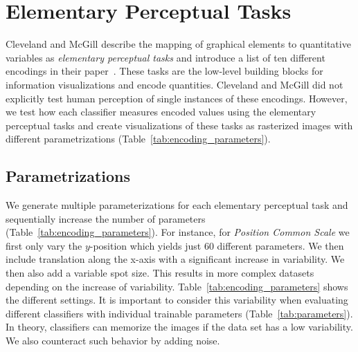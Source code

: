 \section{Elementary Perceptual Tasks}

Cleveland and McGill describe the mapping of graphical elements to quantitative variables as \emph{elementary perceptual tasks} and introduce a list of ten different encodings in their paper~\cite{cleveland_mcgill}. These tasks are the low-level building blocks for information visualizations and encode quantities. Cleveland and McGill did not explicitly test human perception of single instances of these encodings. However, we test how each classifier measures encoded values using the elementary perceptual tasks and create visualizations of these tasks as rasterized images with different parametrizations (Table~\ref{tab:encoding_parameters}).

\subsection{Parametrizations}
\label{sec:parametrizations}
We generate multiple parameterizations for each elementary perceptual task and sequentially increase the number of parameters (Table~\ref{tab:encoding_parameters}). For instance, for \emph{Position Common Scale} we first only vary the $y$-position which yields just $60$ different parameters. We then include translation along the x-axis with a significant increase in variability. We then also add a variable spot size. This results in more complex datasets depending on the increase of variability. Table~\ref{tab:encoding_parameters} shows the different settings. It is important to consider this variability when evaluating different classifiers with individual trainable parameters (Table~\ref{tab:parameters}). In theory, classifiers can memorize the images if the data set has a low variability. We also counteract such behavior by adding noise.

